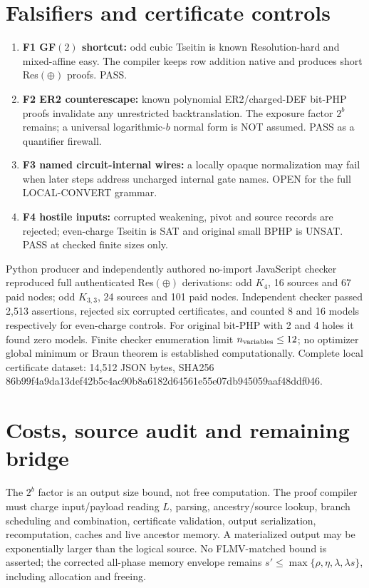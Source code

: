 \documentclass[11pt]{article}
\begin{document}
\section*{Falsifiers and certificate controls}
\begin{enumerate}
\item[] \textbf{F1 GF$(2)$ shortcut:} odd cubic Tseitin is known Resolution-hard and mixed-affine easy. The compiler keeps row addition native and produces short Res$(\oplus)$ proofs. PASS.
\item[] \textbf{F2 ER2 counterescape:} known polynomial ER2/charged-DEF bit-PHP proofs invalidate any unrestricted backtranslation. The exposure factor $2^b$ remains; a universal logarithmic-$b$ normal form is NOT assumed. PASS as a quantifier firewall.
\item[] \textbf{F3 named circuit-internal wires:} a locally opaque normalization may fail when later steps address uncharged internal gate names. OPEN for the full LOCAL-CONVERT grammar.
\item[] \textbf{F4 hostile inputs:} corrupted weakening, pivot and source records are rejected; even-charge Tseitin is SAT and original small BPHP is UNSAT. PASS at checked finite sizes only.
\end{enumerate}
Python producer and independently authored no-import JavaScript checker reproduced full authenticated Res$(\oplus)$ derivations: odd $K_4$, 16 sources and 67 paid nodes; odd $K_{3,3}$, 24 sources and 101 paid nodes. Independent checker passed 2,513 assertions, rejected six corrupted certificates, and counted 8 and 16 models respectively for even-charge controls. For original bit-PHP with 2 and 4 holes it found zero models. Finite checker enumeration limit $n_{\rm variables}\le12$; no optimizer global minimum or Braun theorem is established computationally. Complete local certificate dataset: 14,512 JSON bytes, SHA256 86b99f4a9da13def42b5c4ac90b8a6182d64561e55e07db945059aaf48ddf046.

\section*{Costs, source audit and remaining bridge}
The $2^b$ factor is an output size bound, not free computation. The proof compiler must charge input/payload reading $L$, parsing, ancestry/source lookup, branch scheduling and combination, certificate validation, output serialization, recomputation, caches and live ancestor memory. A materialized output may be exponentially larger than the logical source. No FLMV-matched bound is asserted; the corrected all-phase memory envelope remains $s'\le\max\{\rho,\eta,\lambda,\lambda s\}$, including allocation and freeing.
\end{document}
